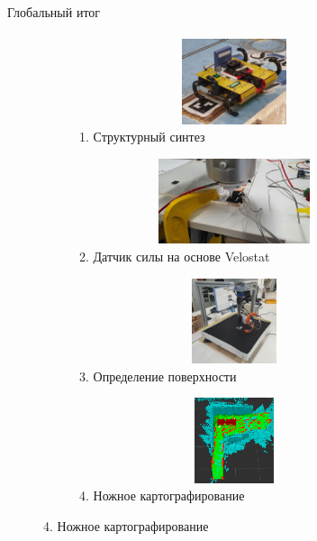 \documentclass[aspectratio=169,xcolor=table]{beamer}
\begin{document}
\begin{frame}[t]{Глобальный итог}
    \framesubtitle{}
    \large
    \vspace{-0.5cm}
    \begin{figure}[H]
        \begin{subfigure}[t]{0.49\textwidth}
            \centering\includegraphics[height=2.5cm,width=1\textwidth,keepaspectratio]{strirus_3.JPG}
            \caption*{1. Структурный синтез}
        \end{subfigure}
        \begin{subfigure}[t]{0.49\textwidth}
            \centering\includegraphics[height=2.5cm,width=1\textwidth,keepaspectratio]{velostat_sensor_look.JPG}
            \caption*{2. Датчик силы на основе Velostat}
        \end{subfigure}
    
        \begin{subfigure}[t]{0.49\textwidth}
            \centering\includegraphics[height=2.5cm,width=1\textwidth,keepaspectratio]{s_shape_leg/s_leg_setup.JPG}
            \caption*{3. Определение поверхности}
        \end{subfigure}
        \begin{subfigure}[t]{0.49\textwidth}
            \centering\includegraphics[height=2.5cm,width=1\textwidth,keepaspectratio]{conv_concave.png}
            \caption*{4. Ножное картографирование}
        \end{subfigure}
    \end{figure}
\end{frame}
\end{document}
